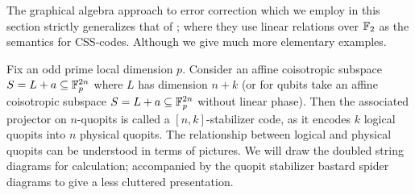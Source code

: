 The graphical algebra approach to error correction which we employ in this section strictly generalizes that of \cite{grok}; where they use linear relations over $\mathbb{F}_2$ as the semantics for CSS-codes. Although we give much more elementary examples.

Fix an odd prime local dimension  $p$.
Consider an affine coisotropic subspace $S=L+a \subseteq \mathbb{F}_p^{2n}$ where $L$ has dimension $n+k$ (or for qubits take an affine coisotropic subspace $S=L+a \subseteq \mathbb{F}_p^{2n}$ without linear phase).  Then the associated projector on $n$-quopits is called a $[n,k]$-stabilizer code, as it encodes $k$ logical quopits into $n$ physical quopits. 
The relationship between logical and physical quopits can be understood in terms of pictures.  We will draw the doubled string diagrams for calculation; accompanied by the quopit stabilizer bastard spider diagrams to give a less cluttered presentation.

